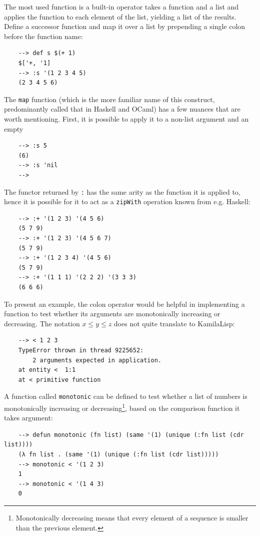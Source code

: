 The most used function is a built-in operator takes a function and a list and applies the function to each element of the list, yielding a list of the results. Define a successor function and map it over a list by prepending a single colon before the function name:

\begin{Verbatim}
    --> def s $(+ 1)
    $['+, '1]
    --> :s '(1 2 3 4 5)
    (2 3 4 5 6)
\end{Verbatim}

The \verb|map| function (which is the more familiar name of this construct, predominantly called that in Haskell and OCaml) has a few nuances that are worth mentioning. First, it is possible to apply it to a non-list argument and an empty 

\begin{Verbatim}
    --> :s 5
    (6)
    --> :s 'nil
    -->
\end{Verbatim}

The functor returned by \verb|:| has the same arity as the function it is applied to, hence it is possible for it to act as a \verb|zipWith| operation known from e.g. Haskell:

\begin{Verbatim}
    --> :+ '(1 2 3) '(4 5 6)
    (5 7 9)
    --> :+ '(1 2 3) '(4 5 6 7)
    (5 7 9)
    --> :+ '(1 2 3 4) '(4 5 6)
    (5 7 9)
    --> :+ '(1 1 1) '(2 2 2) '(3 3 3)
    (6 6 6)
\end{Verbatim}

To present an example, the colon operator would be helpful in implementing a function to test whether its arguments are monotonically increasing or decreasing. The notation $x \le y \le z$ does not quite translate to KamilaLisp:

\begin{Verbatim}
    --> < 1 2 3
    TypeError thrown in thread 9225652:
        2 arguments expected in application.
    at entity <  1:1
    at < primitive function
\end{Verbatim}

A function called \verb|monotonic| can be defined to test whether a list of numbers is monotonically increasing or decreasing\footnote{Monotonically decreasing means that every element of a sequence is smaller than the previous element.}, based on the comparison function it takes argument:

\begin{Verbatim}
    --> defun monotonic (fn list) (same '(1) (unique (:fn list (cdr list))))
    (λ fn list . (same '(1) (unique (:fn list (cdr list)))))
    --> monotonic < '(1 2 3)
    1
    --> monotonic < '(1 4 3)
    0
\end{Verbatim}

